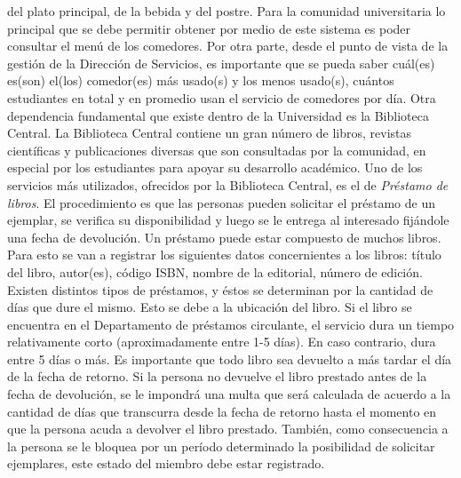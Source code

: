 \documentclass[12pt,a4paper,spanish]{article}
\begin{document}
del plato principal, de la bebida y del postre. 
\newline
\newline
\indent Para la comunidad universitaria lo principal que se debe
permitir obtener por medio de este sistema es poder consultar el men\'u
de los comedores. Por otra parte, desde el punto de vista
de la gesti\'on de la Direcci\'on de Servicios, es importante que se pueda saber
cu\'al(es) es(son) el(los) comedor(es) m\'as usado(s) y los menos
usado(s), cu\'antos estudiantes en total y en promedio usan el servicio de comedores por
d\'ia.
\newline
\newline
\indent Otra dependencia fundamental que existe dentro de la
Universidad es la Biblioteca Central. La Biblioteca
Central contiene un gran n\'umero de libros, revistas cient\'ificas y 
publicaciones diversas que son consultadas por la comunidad, en
especial por los estudiantes para apoyar su desarrollo acad\'emico.
\newline
\newline
\indent Uno de los servicios m\'as utilizados, ofrecidos por la Biblioteca Central, 
es el de \emph{Pr\'estamo de libros}. El procedimiento es que las personas pueden solicitar
el pr\'estamo de un ejemplar, se verifica su disponibilidad y luego
se le entrega al interesado fij\'andole una fecha de devoluci\'on. Un
pr\'estamo puede estar compuesto de muchos libros. Para esto se van a registrar los
siguientes datos concernientes a los libros: t\'itulo del libro,
autor(es), c\'odigo ISBN, nombre de la editorial, n\'umero de
edici\'on. Existen distintos tipos de pr\'estamos, y \'estos se
determinan por la cantidad de d\'ias que dure el mismo. Esto se debe a
la ubicaci\'on del libro. Si el libro se encuentra en el Departamento
de pr\'estamos circulante, el servicio dura un tiempo relativamente
corto (aproximadamente entre 1-5 d\'ias). En caso contrario, dura entre 5 d\'ias o m\'as. 
\newline
\newline
\indent Es importante que todo libro sea devuelto a
m\'as tardar el d\'ia de la fecha de retorno. Si la persona no devuelve el libro
prestado antes de la fecha de devoluci\'on, se le impondr\'a una multa que
ser\'a calculada de acuerdo a la cantidad de d\'ias que transcurra
desde la fecha de retorno hasta el momento en que la persona acuda a
devolver el libro prestado. Tambi\'en, como consecuencia a la persona se le
bloquea por un per\'iodo determinado la posibilidad de solicitar ejemplares, este estado del miembro debe estar registrado.   
\end{document}
